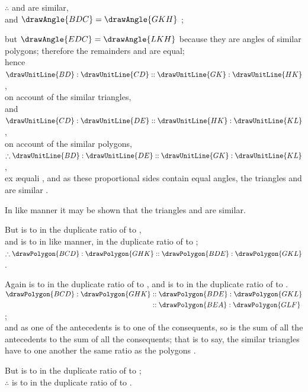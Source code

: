 \documentclass[booklanguage=english]{byrnebook}
\begin{document}
\begin{center}
$\therefore$  and  are similar,\\
and $\drawAngle{BDC} = \drawAngle{GKH}$ ;

but $\drawAngle{EDC} = \drawAngle{LKH}$ because they are angles of similar polygons; therefore the remainders  and  are equal;\\
hence $\drawUnitLine{BD} : \drawUnitLine{CD} :: \drawUnitLine{GK} : \drawUnitLine{HK}$,\\
on account of the similar triangles,\\
and $\drawUnitLine{CD} : \drawUnitLine{DE} :: \drawUnitLine{HK} : \drawUnitLine{KL}$,\\
on account of the similar polygons,\\
$\therefore \drawUnitLine{BD} : \drawUnitLine{DE} :: \drawUnitLine{GK} : \drawUnitLine{KL}$,\\
ex æquali , and as these proportional sides contain equal angles, the triangles  and  are similar .

In like manner it may be shown that the triangles  and  are similar.

But  is to  in the duplicate ratio of  to  ,\\
and  is to  in like manner, in the duplicate ratio of  to ;\\
$\therefore \drawPolygon{BCD} : \drawPolygon{GHK} :: \drawPolygon{BDE} : \drawPolygon{GKL}$ .

Again  is to  in the duplicate ratio of  to , and  is to  in the duplicate ratio of  to .\\
$\begin{aligned}
\drawPolygon{BCD} : \drawPolygon{GHK} &:: \drawPolygon{BDE} : \drawPolygon{GKL} \\
&:: \drawPolygon{BEA} : \drawPolygon{GLF} \\
\end{aligned}$;\\
and as one of the antecedents is to one of the consequents, so is the sum of all the antecedents to the sum of all the consequents; that is to say, the similar triangles have to one another the same ratio as the polygons .

But  is to  in the duplicate ratio of  to ;\\
$\therefore$  is to  in the duplicate ratio of  to .
\end{center}
\end{document}
